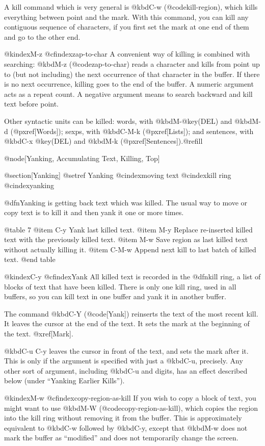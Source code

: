 {{{{{{  A kill command which is very general is @kbd{C-w} (@code{kill-region}),
which kills everything between point and the mark.  With this command, you
can kill any contiguous sequence of characters, if you first set the mark
at one end of them and go to the other end.

@kindex{M-z}
@cfindex{zap-to-char}
  A convenient way of killing is combined with searching: @kbd{M-z}
(@code{zap-to-char}) reads a character and kills from point up to (but not
including) the next occurrence of that character in the buffer.  If there
is no next occurrence, killing goes to the end of the buffer.  A numeric
argument acts as a repeat count.  A negative argument means to search
backward and kill text before point.

  Other syntactic units can be killed: words, with
@kbd{M-@key(DEL)} and @kbd{M-d} (@pxref[Words]); sexps,
with @kbd{C-M-k} (@pxref[Lists]); and sentences, with @kbd{C-x
@key(DEL)} and @kbd{M-k} (@pxref[Sentences]).@refill

@node[Yanking, Accumulating Text, Killing, Top]

@section[Yanking]
@setref Yanking
@cindex{moving text}
@cindex{kill ring}
@cindex{yanking}

  @dfn{Yanking} is getting back text which was killed.  The usual way to
move or copy text is to kill it and then yank it one or more times.

@table 7
@item C-y
Yank last killed text.
@item M-y
Replace re-inserted killed text with the previously killed text.
@item M-w
Save region as last killed text without actually killing it.
@item C-M-w
Append next kill to last batch of killed text.
@end table

@kindex{C-y}
@cfindex{Yank}
  All killed text is recorded in the @dfn{kill ring}, a list of blocks
of text that have been killed.  There is only one kill ring, used in
all buffers, so you can kill text in one buffer and yank it in another
buffer.

  The command @kbd{C-Y} (@code[Yank]) reinserts the text of the most recent
kill.  It leaves the cursor at the end of the text.  It sets the mark at
the beginning of the text.  @xref[Mark].

  @kbd{C-u C-y} leaves the cursor in front of the text, and sets the
mark after it.  This is only if the argument is specified with just a
@kbd{C-u}, precisely.  Any other sort of argument, including @kbd{C-u}
and digits, has an effect described below (under ``Yanking Earlier
Kills'').

@kindex{M-w}
@cfindex{copy-region-as-kill}
  If you wish to copy a block of text, you might want to use @kbd{M-W}
(@code{copy-region-as-kill}), which copies the region into the kill
ring without removing it from the buffer.  This is approximately
equivalent to @kbd{C-w} followed by @kbd{C-y}, except that @kbd{M-w}
does not mark the buffer as ``modified'' and does not temporarily
change the screen.

}}}}}}

